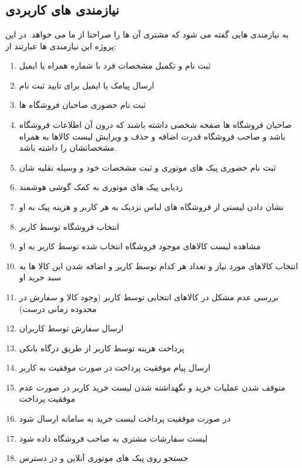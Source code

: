 \documentclass[12pt,a4paper]{article}
\begin{document}
\section{} \label{section.RC}


\subsection{\textbf{نیازمندی های کاربردی}} \label{section.RC.functionalRequirements}
	
	
	به نیازمندی هایی گفته می شود که مشتری آن ها را صراحتا از ما می خواهد. در این پروژه این نیازمندی ها عبارتند از:
\begin{enumerate}
	\item
	ثبت نام و تکمیل مشخصات فرد با شماره همراه یا ایمیل
	\item
	ارسال پیامک یا ایمیل برای تایید ثبت نام
	\item
	ثبت نام حضوری صاحبان فروشگاه ها
	\item
	صاحبان فروشگاه ها صفحه شخصی داشته باشند که درون آن اطلاعات فروشگاه باشد و صاحب فروشگاه قدرت اضافه و حذف و ویرایش لیست کالاها به همراه مشخصاتشان را داشته باشد.
	\item
	ثبت نام حضوری پیک های موتوری و ثبت مشخصات خود و وسیله نقلیه شان
\item
ردیابی پیک های موتوری به کمک گوشی هوشمند
\item
نشان دادن لیستی از فروشگاه های لباس نزدیک به هر کاربر و هزینه پیک به او
\item
انتخاب فروشگاه توسط کاربر
\item
مشاهده لیست کالاهای موجود فروشگاه انتخاب شده توسط کاربر به او
\item
انتخاب کالاهای مورد نیاز و تعداد هر کدام توسط کاربر و اضافه شدن این کالا ها به سبد خرید او
\item
بررسی عدم مشکل در کالاهای انتخابی توسط کاربر (وجود کالا و سفارش در محدوده زمانی درست)
\item
ارسال سفارش توسط کاربران
\item
پرداخت هزینه توسط کاربر از طریق درگاه بانکی
\item
ارسال پیام موفقیت پرداخت در صورت موفقیت به کاربر
\item
متوقف شدن عملیات خرید و نگهداشته شدن لیست خرید کاربر در صورت عدم موفقیت پرداخت
\item
در صورت موفقیت پرداخت لیست خرید به سامانه ارسال شود
\item
لیست سفارشات مشتری به صاحب فروشگاه داده شود
\item
جستجو روی پیک های موتوری آنلاین و در دسترس 

\end{enumerate}
\end{document}
